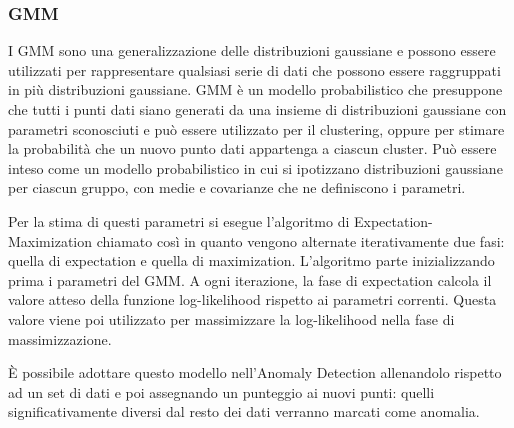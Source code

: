 \subsubsection{GMM}
I GMM sono una generalizzazione delle distribuzioni gaussiane e possono essere utilizzati per rappresentare qualsiasi serie di dati che possono essere raggruppati in più distribuzioni gaussiane. GMM è un modello probabilistico che presuppone che tutti i punti dati siano generati da una insieme di distribuzioni gaussiane con parametri sconosciuti e può essere utilizzato per il clustering, oppure per stimare la probabilità che un nuovo punto dati appartenga a ciascun cluster. Può essere inteso come un modello probabilistico in cui si ipotizzano distribuzioni gaussiane per ciascun gruppo, con medie e covarianze che ne definiscono i parametri.

Per la stima di questi parametri si esegue l'algoritmo di Expectation-Maximization chiamato così in quanto vengono alternate iterativamente due fasi: quella di expectation e quella di maximization. L'algoritmo parte inizializzando prima i parametri del GMM. A ogni iterazione, la fase di expectation calcola il valore atteso della funzione log-likelihood rispetto ai parametri correnti. Questa valore viene poi utilizzato per massimizzare la log-likelihood nella fase di massimizzazione.

È possibile adottare questo modello nell'Anomaly Detection allenandolo rispetto ad un set di dati e poi assegnando un punteggio ai nuovi punti: quelli significativamente diversi dal resto dei dati verranno marcati come anomalia.

